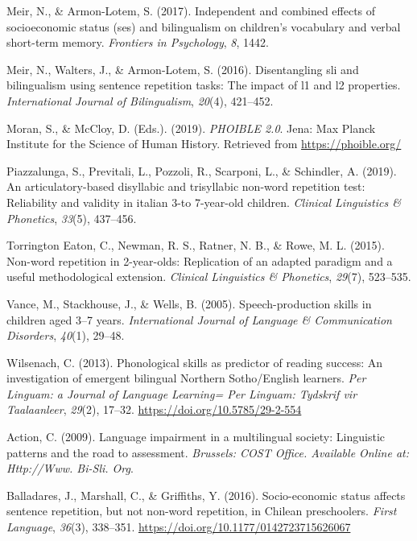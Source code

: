 \documentclass[english,,man,floatsintext]{apa6}
\begin{document}
\leavevmode\hypertarget{ref-meir2017independent}{}%
Meir, N., \& Armon-Lotem, S. (2017). Independent and combined effects of socioeconomic status (ses) and bilingualism on children's vocabulary and verbal short-term memory. \emph{Frontiers in Psychology}, \emph{8}, 1442.

\leavevmode\hypertarget{ref-meir2016disentangling}{}%
Meir, N., Walters, J., \& Armon-Lotem, S. (2016). Disentangling sli and bilingualism using sentence repetition tasks: The impact of l1 and l2 properties. \emph{International Journal of Bilingualism}, \emph{20}(4), 421--452.

\leavevmode\hypertarget{ref-phoible}{}%
Moran, S., \& McCloy, D. (Eds.). (2019). \emph{PHOIBLE 2.0}. Jena: Max Planck Institute for the Science of Human History. Retrieved from \url{https://phoible.org/}

\leavevmode\hypertarget{ref-piazzalunga2019articulatory}{}%
Piazzalunga, S., Previtali, L., Pozzoli, R., Scarponi, L., \& Schindler, A. (2019). An articulatory-based disyllabic and trisyllabic non-word repetition test: Reliability and validity in italian 3-to 7-year-old children. \emph{Clinical Linguistics \& Phonetics}, \emph{33}(5), 437--456.

\leavevmode\hypertarget{ref-torrington2015non}{}%
Torrington Eaton, C., Newman, R. S., Ratner, N. B., \& Rowe, M. L. (2015). Non-word repetition in 2-year-olds: Replication of an adapted paradigm and a useful methodological extension. \emph{Clinical Linguistics \& Phonetics}, \emph{29}(7), 523--535.

\leavevmode\hypertarget{ref-vance2005speech}{}%
Vance, M., Stackhouse, J., \& Wells, B. (2005). Speech-production skills in children aged 3--7 years. \emph{International Journal of Language \& Communication Disorders}, \emph{40}(1), 29--48.

\leavevmode\hypertarget{ref-wilsenach2013phonological}{}%
Wilsenach, C. (2013). Phonological skills as predictor of reading success: An investigation of emergent bilingual Northern Sotho/English learners. \emph{Per Linguam: a Journal of Language Learning= Per Linguam: Tydskrif vir Taalaanleer}, \emph{29}(2), 17--32. \url{https://doi.org/10.5785/29-2-554}

\leavevmode\hypertarget{ref-is08042009language}{}%
Action, C. (2009). Language impairment in a multilingual society: Linguistic patterns and the road to assessment. \emph{Brussels: COST Office. Available Online at: Http://Www. Bi-Sli. Org}.

\leavevmode\hypertarget{ref-balladares2016socio}{}%
Balladares, J., Marshall, C., \& Griffiths, Y. (2016). Socio-economic status affects sentence repetition, but not non-word repetition, in Chilean preschoolers. \emph{First Language}, \emph{36}(3), 338--351. \url{https://doi.org/10.1177/0142723715626067}
\end{document}
